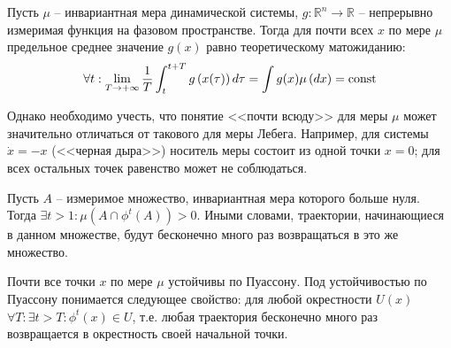 \begin{theorem}
    Пусть $\mu$ -- инвариантная мера динамической системы, $g: \mathbb{R}^n \to \mathbb{R}$ -- непрерывно измеримая функция на фазовом пространстве. Тогда для почти всех $x$ по мере $\mu$ предельное среднее значение $g(x)$ равно теоретическому матожиданию:
    \begin{equation*}
        \forall t: \lim_{T \to +\infty} \frac{1}{T} \int_{t}^{t+T} g\left( x(\tau) \right) d\tau = \int g(x) \mu\left( dx \right) = \mathrm{const}
    \end{equation*}
    
    Однако необходимо учесть, что понятие <<почти всюду>> для меры $\mu$ может значительно отличаться от такового для меры Лебега.
    Например, для системы $\dot{x} = -x$ (<<черная дыра>>) носитель меры состоит из одной точки $x=0$; для всех остальных точек равенство может не соблюдаться.
\end{theorem}


\begin{theorem}
    Пусть $A$ -- измеримое множество, инвариантная мера которого больше нуля.
    Тогда $\exists t > 1: \mu\left( A \cap \phi^t\left( A \right) \right) > 0$.
    Иными словами, траектории, начинающиеся в данном множестве, будут бесконечно много раз возвращаться в это же множество.
\end{theorem}

\begin{theorem}
    Почти все точки $x$ по мере $\mu$ устойчивы по Пуассону.
    Под устойчивостью по Пуассону понимается следующее свойство: для любой окрестности $U(x)$ $\forall T: \exists t > T: \phi^t(x) \in U$, т.е. любая траектория бесконечно много раз возвращается в окрестность своей начальной точки.
\end{theorem}

